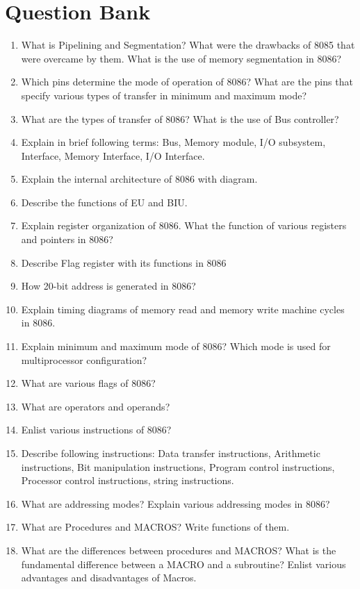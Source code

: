 \documentclass[12pt, a4paper]{scrartcl}
\begin{document}
\section{Question Bank}
	\begin{enumerate}
		\item What is Pipelining and Segmentation? What were the drawbacks of 8085 that were overcame by them. What is the use of memory segmentation in 8086?
		\item Which pins determine the mode of operation of 8086? What are the pins that specify various types of transfer in minimum and maximum mode?
		\item What are the types of transfer of 8086? What is the use of Bus controller?
		\item Explain in brief following terms: Bus, Memory module, I/O subsystem, Interface, Memory Interface, I/O Interface.
		\item Explain the internal architecture of 8086 with diagram.
		\item Describe the functions of EU and BIU.
		\item Explain register organization of 8086. What the function of various registers and pointers in 8086?
		\item Describe Flag register with its functions in 8086
		\item How 20-bit address is generated in 8086?
		\item Explain timing diagrams of memory read and memory write machine cycles in 8086.
		\item Explain minimum and maximum mode of 8086? Which mode is used for multiprocessor configuration?
		\item What are various flags of 8086?
		\item What are operators and operands?
		\item Enlist various instructions of 8086?
		\item Describe following instructions: Data transfer instructions, Arithmetic instructions, Bit manipulation instructions, Program control instructions, Processor control instructions, string instructions.
		\item What are addressing modes? Explain various addressing modes in 8086?
		\item What are Procedures and MACROS? Write functions of them.
		\item What are the differences between procedures and MACROS? What is the fundamental difference between a MACRO and a subroutine? Enlist various advantages and disadvantages of Macros.

\end{enumerate}
\end{document}
